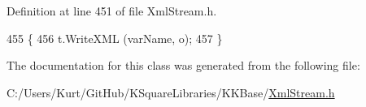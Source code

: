 Definition at line 451 of file Xml\+Stream.\+h.


\begin{DoxyCode}
455     \{
456       t.WriteXML (varName, o);
457     \}
\end{DoxyCode}


The documentation for this class was generated from the following file\+:\begin{DoxyCompactItemize}
\item 
C\+:/\+Users/\+Kurt/\+Git\+Hub/\+K\+Square\+Libraries/\+K\+K\+Base/\hyperlink{_xml_stream_8h}{Xml\+Stream.\+h}\end{DoxyCompactItemize}
